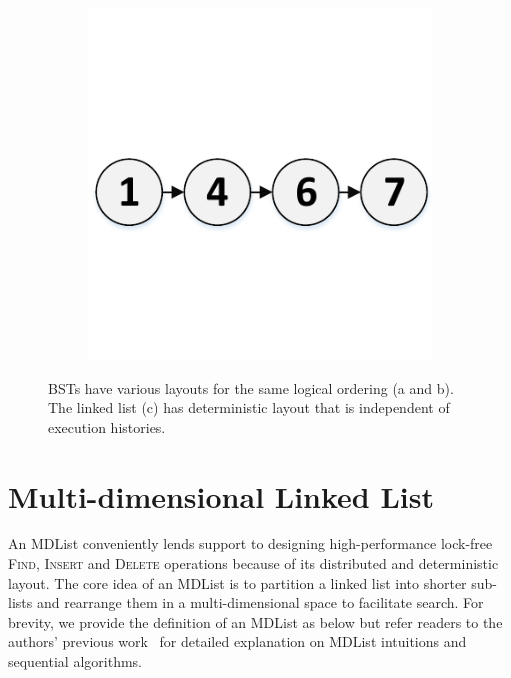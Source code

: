 \documentclass[10pt,conference,compsocconf]{IEEEtran}
\begin{document}
\begin{figure}[t]
\begin{subfigure}{0.32\columnwidth}
        \caption{}
        \label{fig:bst2}
    \end{subfigure}
    \begin{subfigure}{0.32\columnwidth}
        \centering
        \includegraphics[width=1\columnwidth]{./graph/bst3}
        \label{fig:bst3}
        \caption{}
    \end{subfigure}
    \caption{BSTs have various layouts for the same logical ordering (a and b). The linked list (c) has deterministic layout that is independent of execution histories.}
    \label{fig:bst}
    \vspace{-0.2in}
\end{figure}

\section{Multi-dimensional Linked List}
\label{sec:mdlist}
An MDList conveniently lends support to designing high-performance lock-free \textsc{Find}, \textsc{Insert} and \textsc{Delete} operations because of its distributed and deterministic layout.
The core idea of an MDList is to partition a linked list into shorter sub-lists and rearrange them in a multi-dimensional space to facilitate search.
For brevity, we provide the definition of an MDList as below but refer readers to the authors' previous work~\cite{zhang2015lockfree} for detailed explanation on MDList intuitions and sequential algorithms.
\end{document}
